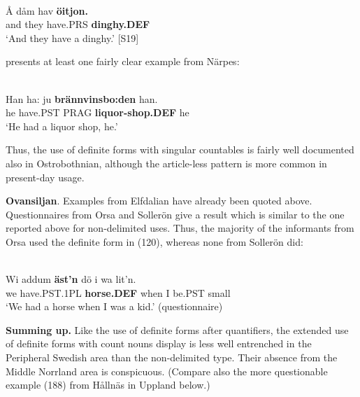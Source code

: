 \z

\ea \label{} 
\\
\gll Å  dåm  hav  \textbf{öitjon.}\\
and  they  have.PRS  \textbf{dinghy.DEF}\\
\glt ‘And they have a dinghy.’ [S19]

\z

\citet{Ivars2005} presents at least one fairly clear example from Närpes:


\ea \label{} 
\\
\gll Han  ha:  ju  \textbf{brännvinsbo:den} han.  \\
he  have.PST  PRAG  \textbf{liquor-shop.DEF} he  \\
\glt ‘He had a liquor shop, he.’ 

\z

Thus, the use of definite forms with singular countables is fairly well documented also in Ostrobothnian, although the article-less pattern is more common in present-day usage.


\textbf{Ovansiljan}. Examples from Elfdalian have already been quoted above. Questionnaires from Orsa and Sollerön give a result which is similar to the one reported above for non-delimited uses. Thus, the majority of the informants from Orsa used the definite form in (120), whereas none from Sollerön did:


\ea \label{} 
\\
\gll Wi  addum  \textbf{äst’n} dö  i  wa  lit’n.\\
we  have.PST.1PL  \textbf{horse.DEF} when  I   be.PST  small\\
\glt ‘We had a horse when I was a kid.’ (questionnaire)

\z

\textbf{Summing up.} Like the use of definite forms after quantifiers, the extended use of definite forms with count nouns display is less well entrenched in the Peripheral Swedish area than the non-delimited type. Their absence from the Middle Norrland area is conspicuous. (Compare also the more questionable example (188) from Hållnäs in Uppland below.)

